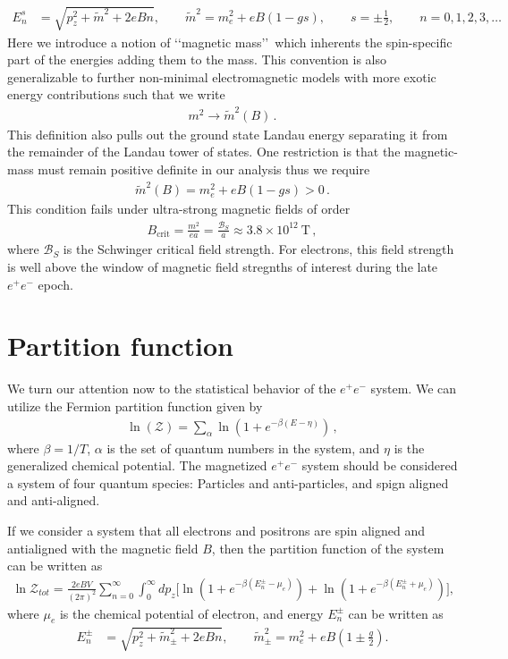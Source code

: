 \documentclass[Universe,article,submit,moreauthors,pdftex]{Definitions/mdpi}
\begin{document}
\begin{align}
  \label{KGPEnergy} E_{n}^{s}&=\sqrt{p^2_z+\tilde{m}^2+2eBn},\qquad\tilde{m}^2=m^2_e+eB\left(1-gs\right),\qquad s=\pm\frac{1}{2},\qquad n=0,1,2,3,\dots
\end{align}
Here we introduce a notion of \lq\lq magnetic mass\rq\rq\ which inherents the spin-specific part of the energies adding them to the mass. This convention is also generalizable to further non-minimal electromagnetic models with more exotic energy contributions such that we write
\begin{align}
  \label{MagMass} m^{2}\rightarrow\tilde{m}^2(B)\,.
\end{align}
This definition also pulls out the ground state Landau energy separating it from the remainder of the Landau tower of states. One restriction is that the magnetic-mass must remain positive definite in our analysis thus we require
\begin{align}
  \label{MagMass} \tilde{m}^2(B)=m^2_e+eB\left(1-gs\right)>0\,.
\end{align}
This condition fails under ultra-strong magnetic fields of order
\begin{align}
  \label{MagMassFail} B_{\mathrm{crit}}=\frac{m^{2}}{ea}=\frac{\mathcal{B}_{S}}{a}\approx3.8\times10^{12}\ \mathrm{T}\,,
\end{align}
where $\mathcal{B}_{S}$ is the Schwinger critical field strength. For electrons, this field strength is well above the window of magnetic field stregnths of interest during the late $e^{+}e^{-}$ epoch.

\section{Partition function}
\noindent We turn our attention now to the statistical behavior of the $e^{+}e^{-}$ system. We can utilize the Fermion partition function given by
\begin{align}
  \label{PartFunc} \ln(\mathcal{Z})=\sum_{\alpha}\ln\left(1+e^{-\beta(E-\eta)}\right)\,,
\end{align}
where $\beta=1/T$, $\alpha$ is the set of quantum numbers in the system, and $\eta$ is the generalized chemical potential. The magnetized $e^{+}e^{-}$ system should be considered a system of four quantum species: Particles and anti-particles, and spign aligned and anti-aligned.
 
If we consider a system that all electrons and positrons are spin aligned and antialigned with the magnetic field $B$, then the partition function of the system can be written as
\begin{align}
\ln\mathcal{Z}_{tot}=\frac{2eBV}{(2\pi)^2}\sum_{n=0}^\infty\int^\infty_{0} \!\!dp_z\bigg[\ln\left(1+e^{-\beta(E_{n}^\pm-\mu_e)}\right)+\ln\left(1+e^{-\beta(E_{n}^\pm+\mu_e)}\right)\bigg],
\end{align}
where $\mu_e$ is the chemical potential of electron, and energy $E_{n}^\pm$ can be written as
\begin{align}
E_{n}^\pm&=\sqrt{p^2_z+\tilde m^2_\pm+2eBn},\qquad\tilde{m}^2_\pm=m^2_e+eB\left(1\pm\frac{g}{2}\right).
\end{align}
\end{document}
